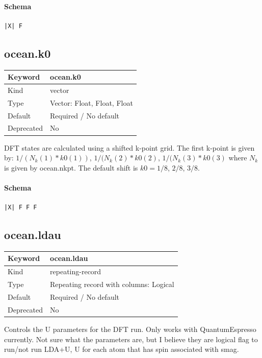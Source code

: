 \documentclass[11pt]{article}
\begin{document}
{{{{{\paragraph{Schema}
\begin{Verbatim}
|X| F
\end{Verbatim}

\subsection{ocean.k0}
\label{kw:ocean-k0}
\begin{longtable}{|p{1.5in}|p{4.5in}|}
\hline
Keyword & ocean.k0 \\
\hline
Kind & vector \\
\hline
Type & Vector: Float, Float, Float \\
\hline
Default & Required / No default \\
\hline
Deprecated & No \\
\hline
\end{longtable}
 DFT states are calculated using a shifted k-point grid. The first k-point is
 given by:
   $1/(N_{k}(1)*k0(1))$, $1/(N_{k}(2)*k0(2)$, $1/(N_{k}(3)*k0(3)$
 where $N_k$ is given by ocean.nkpt. The default shift is $k0 = 1/8$, $2/8$, $3/8$.

\paragraph{Schema}
\begin{Verbatim}
|X| F F F
\end{Verbatim}

\subsection{ocean.ldau}
\label{kw:ocean-ldau}
\begin{longtable}{|p{1.5in}|p{4.5in}|}
\hline
Keyword & ocean.ldau \\
\hline
Kind & repeating-record \\
\hline
Type & Repeating record with columns: Logical \\
\hline
Default & Required / No default \\
\hline
Deprecated & No \\
\hline
\end{longtable}
 Controls the U parameters for the DFT run. Only works with QuantumEspresso
 currently. Not sure what the parameters are, but I believe they are
 logical flag to run/not run LDA+U, U for each atom that has spin
 associated with smag.

}}}}}
\end{document}

